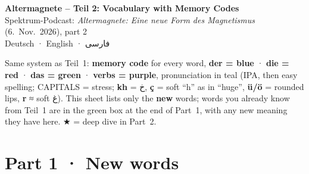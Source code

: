 \documentclass[10pt]{article}
\newcommand{\fa}[1]{{\farsifont\beginR #1\endR}}
\newcommand{\key}[1]{\textcolor{codec}{\textbf{#1}}}
\begin{document}
\begin{center}
{\LARGE\bfseries Altermagnete – Teil 2: Vocabulary with Memory Codes}\\[4pt]
{\large Spektrum-Podcast: \emph{Altermagnete: Eine neue Form des Magnetismus} (6.~Nov.~2026), part 2}\\[2pt]
{\normalsize Deutsch · English · \fa{فارسی}}
\end{center}

\noindent Same system as Teil~1: \key{memory code} for every word,
\textcolor{derc}{\textbf{der = blue}} · \textcolor{diec}{\textbf{die = red}} · \textcolor{dasc}{\textbf{das = green}} · \textcolor{verbc}{\textbf{verbs = purple}},
pronunciation in \textcolor{pronc}{teal} (IPA, then easy spelling; CAPITALS = stress; \textbf{kh} = \fa{خ}, \textbf{ç} = soft “h” as in “huge”, \textbf{ü/ö} = rounded lips, \textbf{r} ≈ soft \fa{غ}).
This sheet lists only the \textbf{new} words; words you already know from Teil~1 are in the green box at the end of Part~1,
with any new meaning they have here. \textsf{★} = deep dive in Part~2.

\vspace{6pt}
\section*{Part 1 · New words}
\end{document}
